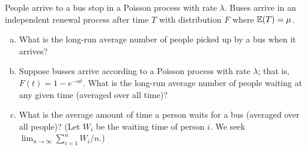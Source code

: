 \begin{example}People arrive to a bus stop in a Poisson process with rate \(\lambda\). Buses arrive in an independent renewal process after time \(T\) with distribution \(F\) where \(\E(T) = \mu\).

\begin{enumerate}[(a)]

\item What is the long-run average number of people picked up by a bus when it arrives?

\item Suppose busses arrive according to a  Poisson process with rate \(\lambda\); that is, \(F(t) = 1 - e^{-\alpha t}\). What is the long-run average number of people waiting at any given time (averaged over all time)?

\item What is the average amount of time a person waits for a bus (averaged over all people)? (Let \(W_i\) be the waiting time of person \(i\). We seek \(\lim_{n \to \infty} \sum_{i=1}^n W_i / n\).)

\end{enumerate}

\end{example}

